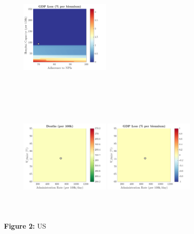 \documentclass[paper=a4, fontsize=11pt]{scrartcl}
\numberwithin{figure}{section}
\numberwithin{table}{section}
\begin{document}
\begin{figure}[H]
\begin{subfigure}[b]{\textwidth}
	\hspace{0.05cm}
    	\includegraphics[width=0.49\textwidth,height=6cm]{US/SPANISH/npl_g}
    \end{subfigure}
    \begin{subfigure}[b]{\textwidth}
      	\includegraphics[width=0.49\textwidth,height=6cm]{US/SPANISH/imm_d}
	\hspace{0.05cm}
    	\includegraphics[width=0.49\textwidth,height=6cm]{US/SPANISH/imm_g}
    \end{subfigure}
\caption*{\textbf{Figure 2:} US} 
\end{figure}
\end{document}
